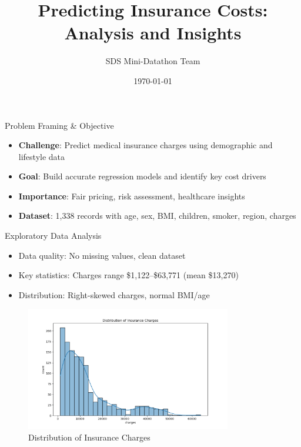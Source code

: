 \documentclass[10pt]{beamer}
\title{Predicting Insurance Costs: Analysis and Insights}
\author{SDS Mini-Datathon Team}
\institute[NUS]{National University of Singapore}
\date{\today}
\begin{document}
\begin{frame}
\titlepage
\end{frame}

\begin{frame}{Problem Framing \& Objective}
\begin{itemize}
\item \textbf{Challenge}: Predict medical insurance charges using demographic and lifestyle data
\item \textbf{Goal}: Build accurate regression models and identify key cost drivers
\item \textbf{Importance}: Fair pricing, risk assessment, healthcare insights
\item \textbf{Dataset}: 1,338 records with age, sex, BMI, children, smoker, region, charges
\end{itemize}
\end{frame}

\begin{frame}{Exploratory Data Analysis}
\begin{itemize}
\item Data quality: No missing values, clean dataset
\item Key statistics: Charges range \$1,122--\$63,771 (mean \$13,270)
\item Distribution: Right-skewed charges, normal BMI/age
\end{itemize}
\begin{figure}
\includegraphics[width=0.8\textwidth]{charges_dist.png}
\caption{Distribution of Insurance Charges}
\end{figure}
\end{frame}
\end{document}
